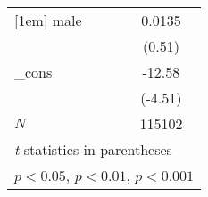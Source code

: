 {\begin{tabular}{l*{1}{c}}
[1em]
male        &      0.0135         \\
            &      (0.51)         \\
[1em]
\_cons      &      -12.58\sym{***}\\
            &     (-4.51)         \\
\hline
\(N\)       &      115102         \\
\hline\hline
\multicolumn{2}{l}{\footnotesize \textit{t} statistics in parentheses}\\
\multicolumn{2}{l}{\footnotesize \sym{*} \(p<0.05\), \sym{**} \(p<0.01\), \sym{***} \(p<0.001\)}\\
\end{tabular}
}
